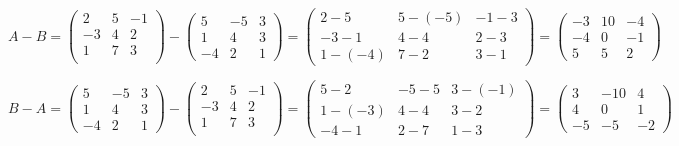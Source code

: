 \documentclass[fleqn]{article}
\begin{document}
\begin{enumerate}
\noindent
$A-B=
\begin{pmatrix}
    2 & 5 & -1 \\
    -3 & 4 & 2 \\ 
    1 & 7 & 3 \\ 
\end{pmatrix}
-
\begin{pmatrix}
  5 & -5 & 3 \\
  1 & 4 & 3 \\
  -4 & 2 & 1
\end{pmatrix}
=
\begin{pmatrix}
  2-5 & 5-(-5) & -1-3 \\
  -3-1 & 4-4 & 2-3 \\
  1-(-4) & 7-2 & 3-1
\end{pmatrix}
=
\begin{pmatrix}
  -3 & 10 & -4 \\
  -4 & 0 & -1 \\
  5 & 5 & 2
\end{pmatrix}
$

\noindent
$B-A=
\begin{pmatrix}
  5 & -5 & 3 \\
  1 & 4 & 3 \\
  -4 & 2 & 1
\end{pmatrix}
-
\begin{pmatrix}
  2 & 5 & -1 \\
  -3 & 4 & 2 \\ 
  1 & 7 & 3 \\ 
\end{pmatrix}
=
\begin{pmatrix}
  5-2 & -5-5 & 3-(-1) \\
  1-(-3) & 4-4 & 3-2 \\
  -4-1 & 2-7 & 1-3
\end{pmatrix}
=
\begin{pmatrix}
  3 & -10 & 4 \\
  4 & 0 & 1 \\
  -5 & -5 & -2
\end{pmatrix}
$



\end{enumerate}
\end{document}
